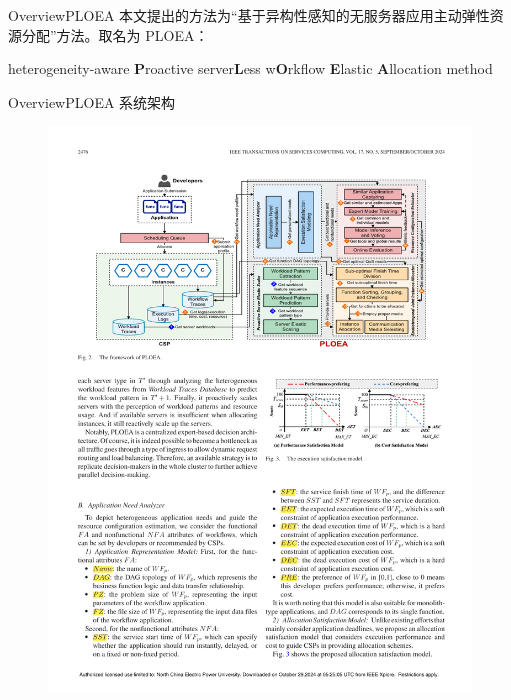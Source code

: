 \documentclass[aspectratio=169]{beamer}
\begin{document}
\begin{frame}{Overview}{PLOEA}
  本文提出的方法为“基于异构性感知的无服务器应用主动弹性资源分配”方法。取名为 PLOEA：

  \begin{center}
    heterogeneity-aware \textbf{\textcolor{NCEPUblue}{P}}roactive server\textbf{\textcolor{NCEPUblue}{L}}ess w\textbf{\textcolor{NCEPUblue}{O}}rkflow \textbf{\textcolor{NCEPUblue}{E}}lastic \textbf{\textcolor{NCEPUblue}{A}}llocation method
  \end{center}
\end{frame}

\begin{frame}{Overview}{PLOEA 系统架构}
  \begin{figure}
    \centering
    \includegraphics[height=0.8\textheight]{img/method/PLOEA-system.pdf}
  \end{figure}
\end{frame}
\end{document}
